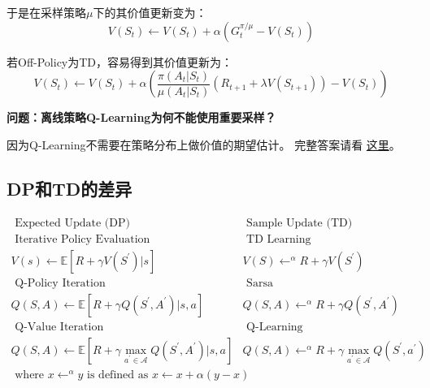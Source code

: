 \documentclass[UTF8]{ctexart}
\begin{document}
于是在采样策略$\mu$下的其价值更新变为：
$$V\left(S_{t}\right) \leftarrow V\left(S_{t}\right)+\alpha\left(G_{t}^{\pi / \mu}-V\left(S_{t}\right)\right)$$

若Off-Policy为TD，容易得到其价值更新为：
\begin{equation}
    V\left(S_{t}\right) \leftarrow V\left(S_{t}\right)+\alpha\left(\frac{\pi\left(A_{t} | S_{t}\right)}{\mu\left(A_{t} | S_{t}\right)}\left(R_{t+1}+
\lambda V\left(S_{t+1}\right)\right)-V\left(S_{t}\right)\right)
\end{equation}


\textbf{问题：离线策略Q-Learning为何不能使用重要采样？}

因为Q-Learning不需要在策略分布上做价值的期望估计。
完整答案请看
\href{https://www.quora.com/Why-doesn-t-DQN-use-importance-sampling-Dont-we-always-use-this-method-to-correct-the-sampling-error-produced-by-the-off-policy}{这里}。

\subsection{DP和TD的差异}

$$\begin{array}{l|l}
    \text { Expected Update (DP) } & \text { Sample Update (TD) } \\
    \hline \text { Iterative Policy Evaluation } & \text { TD Learning } \\
    V(s) \leftarrow \mathbb{E}\left[R+\gamma V\left(S^{\prime}\right) | s\right] & V(S) \leftarrow^{\alpha} R+\gamma V\left(S^{\prime}\right) \\
    \hline \text { Q-Policy Iteration } & \text { Sarsa } \\
    Q(S, A) \leftarrow \mathbb{E}\left[R+\gamma Q\left(S^{\prime}, A^{\prime}\right) | s, a\right] & Q(S, A) \leftarrow^{\alpha} R+\gamma Q\left(S^{\prime}, A^{\prime}\right) \\
    \hline \text { Q-Value Iteration } & \text { Q-Learning } \\
    Q(S, A) \leftarrow \mathbb{E}\left[R+\gamma \max _{a^{\prime} \in \mathcal{A}} Q\left(S^{\prime}, A^{\prime}\right) | s, a\right] & Q(S, A) \leftarrow^{\alpha} R+\gamma \max _{a^{\prime} \in \mathcal{A}} Q\left(S^{\prime}, a^{\prime}\right) \\
    \hline \text { where } x \leftarrow^{\alpha} y \text { is defined as } x \leftarrow x+\alpha(y-x) & \\
 \end{array}
 $$
\end{document}
